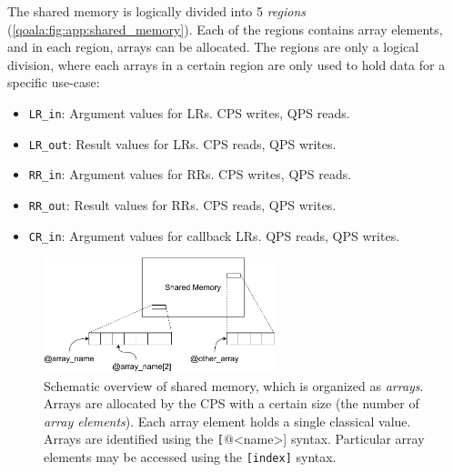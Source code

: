 The shared memory is logically divided into 5 \textit{regions} (\cref{qoala:fig:app:shared_memory}).
Each of the regions contains array elements, and in each region, arrays can be allocated.
The regions are only a logical division, where each arrays in a certain region are only used to hold data for a specific use-case:

\begin{itemize}
\item \texttt{LR\_in}: Argument values for LRs. CPS writes, QPS reads.
\item \texttt{LR\_out}: Result values for LRs. CPS reads, QPS writes.
\item \texttt{RR\_in}: Argument values for RRs. CPS writes, QPS reads.
\item \texttt{RR\_ou}t: Result values for RRs. CPS reads, QPS writes.
\item \texttt{CR\_in}: Argument values for callback LRs. QPS reads, QPS writes.
\end{itemize}


\begin{figure}[t]
    \centering
    \includegraphics[width=0.6\textwidth]{figures/qoala/arrays.pdf}
    \caption{Schematic overview of shared memory, which is organized as \textit{arrays}.
    Arrays are allocated by the CPS with a certain size (the number of \textit{array elements}).
    Each array element holds a single classical value.
    Arrays are identified using the \texttt[@<name>] syntax.
    Particular array elements may be accessed using the \texttt{[index]} syntax.
    }
    \label{qoala:fig:app:arrays}
\end{figure}


